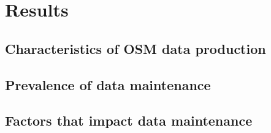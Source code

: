 \chapter{Results}
\label{chapterlabel5}

\section{Characteristics of OSM data production}



\section{Prevalence of data maintenance}

\section{Factors that impact data maintenance}